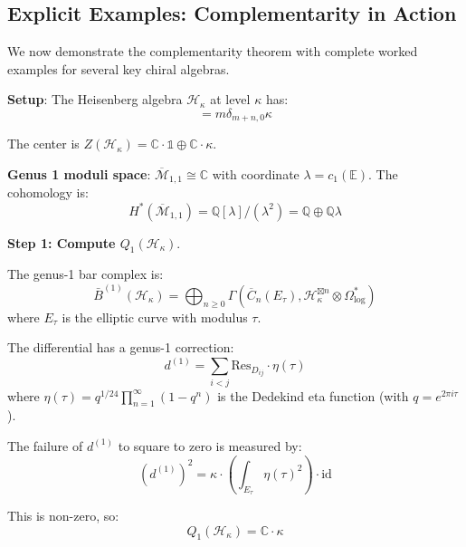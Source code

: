\subsection{Explicit Examples: Complementarity in Action}

We now demonstrate the complementarity theorem with complete worked examples for 
several key chiral algebras.

\begin{example}
\label{ex:heisenberg-complementarity-explicit}

\textbf{Setup}: The Heisenberg algebra $\mathcal{H}_\kappa$ at level $\kappa$ has:
\begin{equation}
[a_m, a_n] = m\delta_{m+n,0} \kappa
\end{equation}

The center is $Z(\mathcal{H}_\kappa) = \mathbb{C} \cdot \mathbb{1} \oplus \mathbb{C} 
\cdot \kappa$.

\textbf{Genus 1 moduli space}: $\overline{\mathcal{M}}_{1,1} \cong \mathbb{C}$ with 
coordinate $\lambda = c_1(\mathbb{E})$. The cohomology is:
\begin{equation}
H^*(\overline{\mathcal{M}}_{1,1}) = \mathbb{Q}[\lambda] / (\lambda^2) = \mathbb{Q} 
\oplus \mathbb{Q}\lambda
\end{equation}

\textbf{Step 1: Compute $Q_1(\mathcal{H}_\kappa)$}.

The genus-1 bar complex is:
\begin{equation}
\bar{B}^{(1)}(\mathcal{H}_\kappa) = \bigoplus_{n \geq 0} \Gamma(\overline{C}_n(E_\tau), 
\mathcal{H}_\kappa^{\boxtimes n} \otimes \Omega^*_{\log})
\end{equation}
where $E_\tau$ is the elliptic curve with modulus $\tau$.

The differential has a genus-1 correction:
\begin{equation}
d^{(1)} = \sum_{i<j} \text{Res}_{D_{ij}} \cdot \eta(\tau)
\end{equation}
where $\eta(\tau) = q^{1/24} \prod_{n=1}^\infty (1-q^n)$ is the Dedekind eta function 
(with $q = e^{2\pi i \tau}$).

The failure of $d^{(1)}$ to square to zero is measured by:
\begin{equation}
(d^{(1)})^2 = \kappa \cdot \left(\int_{E_\tau} \eta(\tau)^2\right) \cdot \text{id}
\end{equation}

This is non-zero, so:
\begin{equation}
Q_1(\mathcal{H}_\kappa) = \mathbb{C} \cdot \kappa
\end{equation}


\end{example}
